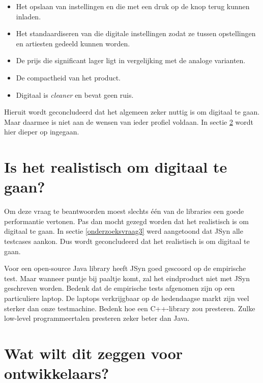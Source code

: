\begin{itemize}
	\item Het opslaan van instellingen en die met een druk op de knop terug kunnen inladen.
	\item Het standaardiseren van die digitale instellingen zodat ze tussen opstellingen en artiesten gedeeld kunnen worden.
	\item De prijs die significant lager ligt in vergelijking met de analoge varianten.
	\item De compactheid van het product.
	\item Digitaal is \textit{cleaner} en bevat geen ruis.
\end{itemize}

Hieruit wordt geconcludeerd dat het algemeen zeker nuttig is om digitaal te gaan. Maar daarmee is niet aan de wensen van ieder profiel voldaan. In sectie \ref{endeontwikkelaars} wordt hier dieper op ingegaan.

\section{Is het realistisch om digitaal te gaan?}
\label{conclusie3}

Om deze vraag te beantwoorden moest slechts één van de libraries een goede performantie vertonen. Pas dan mocht gezegd worden dat het realistisch is om digitaal te gaan. In sectie \ref{onderzoeksvraag3} werd aangetoond dat JSyn alle testcases aankon. Dus wordt geconcludeerd dat het realistisch is om digitaal te gaan.

Voor een open-source Java library heeft JSyn goed gescoord op de empirische test. Maar wanneer puntje bij paaltje komt, zal het eindproduct niet met JSyn geschreven worden. Bedenk dat de empirische tests afgenomen zijn op een particuliere laptop. De laptops verkrijgbaar op de hedendaagse markt zijn veel sterker dan onze testmachine. Bedenk hoe een C++-library zou presteren. Zulke low-level programmeertalen presteren zeker beter dan Java.  

\section{Wat wilt dit zeggen voor ontwikkelaars?}
\label{endeontwikkelaars}

